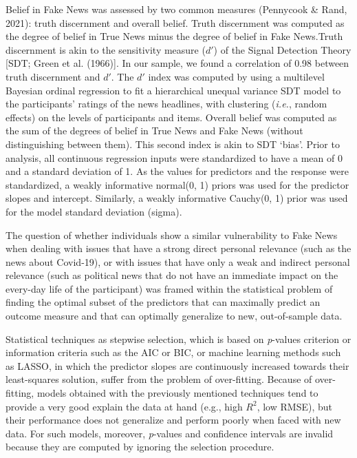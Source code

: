 \documentclass[
  man,floatsintext]{apa6}
\begin{document}
Belief in Fake News was assessed by two common measures (Pennycook \& Rand, 2021): truth discernment and overall belief. Truth discernment was computed as the degree of belief in True News minus the degree of belief in Fake News.Truth discernment is akin to the sensitivity measure (\(d'\)) of the Signal Detection Theory {[}SDT; Green et al. (1966){]}. In our sample, we found a correlation of 0.98 between truth discernment and \(d'\). The \(d'\) index was computed by using a multilevel Bayesian ordinal regression to fit a hierarchical unequal variance SDT model to the participants' ratings of the news headlines, with clustering (\emph{i.e.}, random effects) on the levels of participants and items. Overall belief was computed as the sum of the degrees of belief in True News and Fake News (without distinguishing between them). This second index is akin to SDT `bias'. Prior to analysis, all continuous regression inputs were standardized to have a mean of 0 and a standard deviation of 1. As the values for predictors and the response were standardized, a weakly informative normal(0, 1) priors was used for the predictor slopes and intercept. Similarly, a weakly informative Cauchy(0, 1) prior was used for the model standard deviation (sigma).

The question of whether individuals show a similar vulnerability to Fake News when dealing with issues that have a strong direct personal relevance (such as the news about Covid-19), or with issues that have only a weak and indirect personal relevance (such as political news that do not have an immediate impact on the every-day life of the participant) was framed within the statistical problem of finding the optimal subset of the predictors that can maximally predict an outcome measure and that can optimally generalize to new, out-of-sample data.

Statistical techniques as stepwise selection, which is based on \emph{p}-values criterion or information criteria such as the AIC or BIC, or machine learning methods such as LASSO, in which the predictor slopes are continuously increased towards their least-squares solution, suffer from the problem of over-fitting. Because of over-fitting, models obtained with the previously mentioned techniques tend to provide a very good explain the data at hand (e.g., high \(R^2\), low RMSE), but their performance does not generalize and perform poorly when faced with new data. For such models, moreover, \emph{p}-values and confidence intervals are invalid because they are computed by ignoring the selection procedure.
\end{document}
